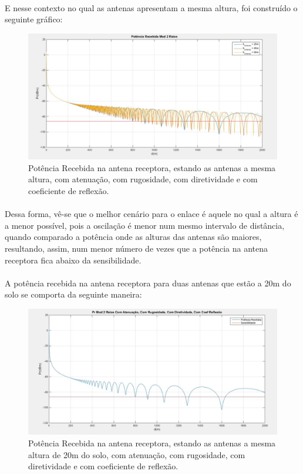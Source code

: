 \paragraph{}E nesse contexto no qual as antenas apresentam a mesma altura, foi construído o seguinte gráfico:

\FloatBarrier
\begin{figure}[!htp]
\centering
\includegraphics[scale = 0.3]{Figuras/Mesma_Altura.JPG}
\caption{Potência Recebida na antena receptora, estando as antenas a mesma altura, com atenuação, com rugosidade, com diretividade e com coeficiente de reflexão.}
\end{figure}
\FloatBarrier

\paragraph{}Dessa forma, vê-se que o melhor cenário para o enlace é aquele no qual a altura é a menor possível, pois a oscilação é menor num mesmo intervalo de distância, quando comparado a potência onde as alturas das antenas são maiores, resultando, assim, num menor número de vezes que a potência na antena receptora fica abaixo da sensibilidade.


\paragraph{}A potência recebida na antena receptora para duas antenas que estão a 20m do solo se comporta da seguinte maneira:

\FloatBarrier
\begin{figure}[!htp]
\centering
\includegraphics[scale = 0.3]{Figuras/Pr_h_20_1.JPG}
\caption{Potência Recebida na antena receptora, estando as antenas a mesma altura de 20m do solo, com atenuação, com rugosidade, com diretividade e com coeficiente de reflexão.}
\end{figure}
\FloatBarrier


